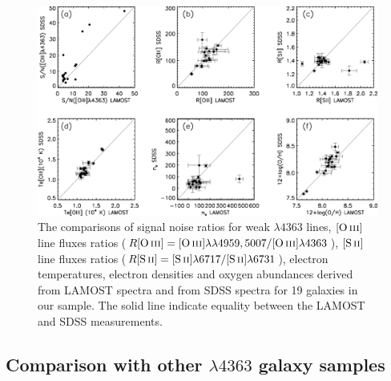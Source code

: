 \documentclass[usenatbib]{raa}
\begin{document}
\begin{figure}[h]
\center
\includegraphics[width=1.0\textwidth]{fig6.eps}
\caption{The comparisons of signal noise ratios for weak 
\oiii$\lambda4363$ lines, $\hbox{[O\,{\sc iii}]}$ line fluxes
ratios ($R \hbox{[O\,{\sc iii}]} = \hbox{[O\,{\sc iii}]}\lambda\lambda4959,5007/\hbox{[O\,{\sc iii}]}\lambda4363$), $\hbox{[S\,{\sc ii}]}$ 
line fluxes ratios 
($ R \hbox{[S\,{\sc ii}]} = \hbox{[S\,{\sc ii}]}\lambda6717/\hbox{[S\,{\sc ii}]}\lambda6731$), electron temperatures, 
electron densities and oxygen abundances
derived from LAMOST spectra and from SDSS spectra for 19 galaxies in our sample. 
The solid line indicate equality between the LAMOST and SDSS measurements.}  
\label{lamo_sdss}
\end{figure}

\subsection{Comparison with other \oiii$\lambda4363$ galaxy samples}
\end{document}

